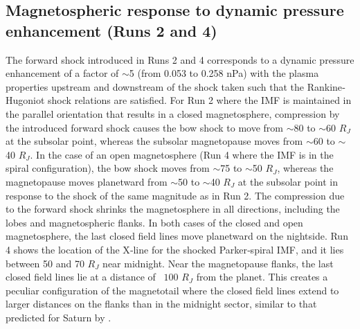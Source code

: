 \subsection{Magnetospheric response to dynamic pressure enhancement (Runs 2 and 4)}

The forward shock introduced in Runs 2 and 4 corresponds to a dynamic pressure enhancement of a factor of $\sim$5 (from 0.053 to 0.258 nPa) with the plasma properties upstream and downstream of the shock taken such that the Rankine‐Hugoniot shock relations are satisfied. For Run 2 where the IMF is maintained in the parallel orientation that results in a closed magnetosphere, compression by the introduced forward shock causes the bow shock to move from $\sim$80 to $\sim$60 $R_J$ at the subsolar point, whereas the subsolar magnetopause moves from $\sim$60 to $\sim$40 $R_J$. In the case of an open magnetosphere (Run 4 where the IMF is in the spiral configuration), the bow shock moves from $\sim$75 to $\sim$50 $R_J$, whereas the magnetopause moves planetward from $\sim$50 to $\sim$40 $R_J$ at the subsolar point in response to the shock of the same magnitude as in Run 2. The compression due to the forward shock shrinks the magnetosphere in all directions, including the lobes and magnetospheric flanks. In both cases of the closed and open magnetosphere, the last closed field lines move planetward on the nightside. Run 4 shows the location of the X‐line for the shocked Parker‐spiral IMF, and it lies between 50 and 70 $R_J$ near midnight. Near the magnetopause flanks, the last closed field lines lie at a distance of ~$100$ $R_J$ from the planet. This creates a peculiar configuration of the magnetotail where the closed field lines extend to larger distances on the flanks than in the midnight sector, similar to that predicted for Saturn by \cite{Jia2012}.

